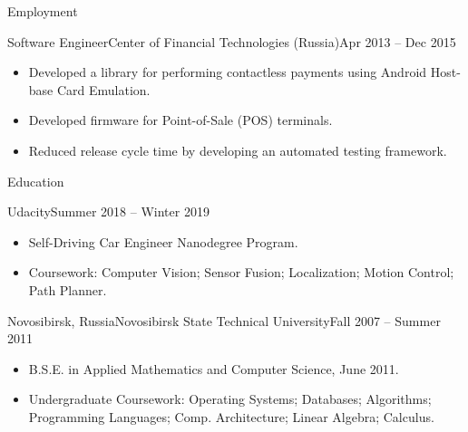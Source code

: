 \documentclass[]{cv}
\begin{document}
\begin{cvsection}{Employment}
    \begin{cvsubsection}{Software Engineer}{Center of Financial Technologies (Russia)}{Apr 2013 -- Dec 2015}
			\begin{itemize}
        \item Developed a library for performing contactless payments using Android Host-base Card Emulation.
        \item Developed firmware for Point-of-Sale (POS) terminals.
        \item Reduced release cycle time by developing an automated testing framework.
			\end{itemize}
		\end{cvsubsection}

	\end{cvsection}

	\begin{cvsection}{Education}
    \begin{cvsubsection}{Udacity}{}{Summer 2018 -- Winter 2019}
			\begin{itemize}
				\item Self-Driving Car Engineer Nanodegree Program.
				\item Coursework: Computer Vision; Sensor Fusion; Localization; Motion Control; Path Planner.
			\end{itemize}
		\end{cvsubsection}
		\begin{cvsubsection}{Novosibirsk, Russia}{Novosibirsk State Technical University}{Fall 2007 -- Summer 2011}
			\begin{itemize}
				\item B.S.E. in Applied Mathematics and Computer Science, June 2011.
				\item Undergraduate Coursework: Operating Systems; Databases; Algorithms; Programming Languages; Comp. Architecture; Linear Algebra; Calculus.
			\end{itemize}
		\end{cvsubsection}
	\end{cvsection}
\end{document}
